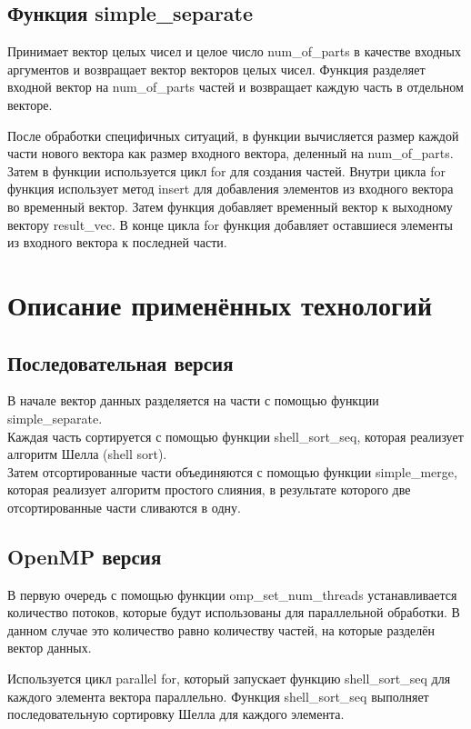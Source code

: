 \documentclass{article}
\begin{document}
\subsection{Функция simple\_separate} Принимает вектор целых чисел и целое число num\_of\_parts в качестве входных аргументов и возвращает вектор векторов целых чисел. Функция разделяет входной вектор на num\_of\_parts частей и возвращает каждую часть в отдельном векторе.

После обработки специфичных ситуаций, в функции вычисляется размер каждой части нового вектора как размер входного вектора, деленный на num\_of\_parts. Затем в функции используется цикл for для создания частей. Внутри цикла for функция использует метод insert для добавления элементов из входного вектора во временный вектор. Затем функция добавляет временный вектор к выходному вектору result\_vec. В конце цикла for функция добавляет оставшиеся элементы из входного вектора к последней части.

\newpage
\section{Описание применённых технологий}

\subsection{Последовательная версия}

В начале вектор данных разделяется на части с помощью функции simple\_separate.\\Каждая часть сортируется с помощью функции shell\_sort\_seq, которая реализует алгоритм Шелла (shell sort).\\Затем отсортированные части объединяются с помощью функции simple\_merge, которая реализует алгоритм простого слияния, в результате которого две отсортированные части сливаются в одну.

\subsection{OpenMP версия}

В первую очередь с помощью функции omp\_set\_num\_threads устанавливается количество потоков, которые будут использованы для параллельной обработки. В данном случае это количество равно количеству частей, на которые разделён вектор данных.

Используется цикл parallel for, который запускает функцию shell\_sort\_seq для каждого элемента вектора параллельно. Функция shell\_sort\_seq выполняет последовательную сортировку Шелла для каждого элемента.
\end{document}
